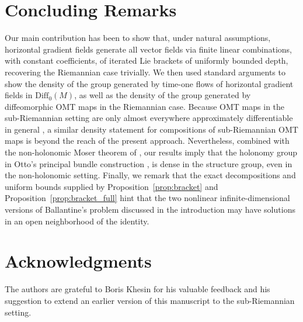 \documentclass{article}
\theoremstyle{remark}
\newcommand{\M}{M}
\newcommand{\Diff}{\mathrm{Diff}_0(\M)}
\begin{document}
\section{Concluding Remarks}
%
Our main contribution has been to show that, under natural assumptions, horizontal gradient fields generate all vector fields via finite linear combinations, with constant coefficients, of iterated Lie brackets of uniformly bounded depth, recovering the Riemannian case trivially. We then used standard arguments to show the density of the group generated by time-one flows of horizontal gradient fields in $\Diff$, as well as the density of the group generated by diffeomorphic OMT maps in the Riemannian case. Because OMT maps in the sub-Riemannian setting are only almost everywhere approximately differentiable in general \cite{figalli2010mass}, a similar density statement for compositions of sub-Riemannian OMT maps is beyond the reach of the present approach. Nevertheless, combined with the non-holonomic Moser theorem of \cite{KhesinLee2009}, our results imply that the holonomy group in Otto's principal bundle construction \cite{otto2001geometry},\cite[Appendix A.5]{WendtKhesin2009} is dense in the structure group, even in the non-holonomic setting. Finally, we remark that the exact decompositions and uniform bounds supplied by Proposition~\ref{prop:bracket} and Proposition~\ref{prop:bracket_full} hint that the two nonlinear infinite-dimensional versions of Ballantine's problem discussed in the introduction may have solutions in an open neighborhood of the identity.

\section*{Acknowledgments}
%
The authors are grateful to Boris Khesin for his valuable feedback and his suggestion to extend an earlier version of this manuscript to the sub-Riemannian setting.



\end{document}
